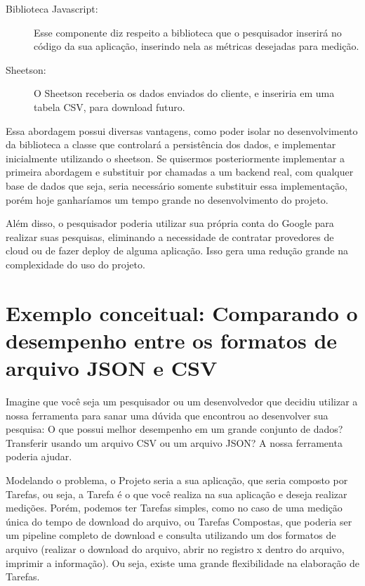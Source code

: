 \documentclass[12pt]{tcc}
\begin{document}
\begin{description}
	\item[Biblioteca Javascript:] Esse componente diz respeito a biblioteca que o pesquisador inserirá no código da sua aplicação, inserindo nela as métricas desejadas para medição.
	
	\item[Sheetson:] O Sheetson receberia os dados enviados do cliente, e inseriria em uma tabela CSV, para download futuro.

\end{description}

Essa abordagem possui diversas vantagens, como poder isolar no desenvolvimento da biblioteca a classe que controlará a persistência dos dados, e implementar inicialmente utilizando o sheetson. Se quisermos posteriormente implementar a primeira abordagem e substituir por chamadas a um backend real, com qualquer base de dados que seja, seria necessário somente substituir essa implementação, porém hoje ganharíamos um tempo grande no desenvolvimento do projeto.

Além disso, o pesquisador poderia utilizar sua própria conta do Google para realizar suas pesquisas, eliminando a necessidade de contratar provedores de cloud ou de fazer deploy de alguma aplicação. Isso gera uma redução grande na complexidade do uso do projeto.



\section{Exemplo conceitual: Comparando o desempenho entre os formatos de arquivo JSON e CSV}

Imagine que você seja um pesquisador ou um desenvolvedor que decidiu utilizar a nossa ferramenta para sanar uma dúvida que encontrou ao desenvolver sua pesquisa:
O que possui melhor desempenho em um grande conjunto de dados? Transferir usando um arquivo CSV ou um arquivo JSON? A nossa ferramenta poderia ajudar.

Modelando o problema, o Projeto seria a sua aplicação, que seria composto por Tarefas, ou seja, a Tarefa é o que você realiza na sua aplicação e deseja realizar medições. Porém, podemos ter Tarefas simples, como no caso de uma medição única do tempo de download do arquivo, ou Tarefas Compostas, que poderia ser um pipeline completo de download e consulta utilizando um dos formatos de arquivo (realizar o download do arquivo, abrir no registro x dentro do arquivo, imprimir a informação). Ou seja, existe uma grande flexibilidade na elaboração de Tarefas.
\end{document}
